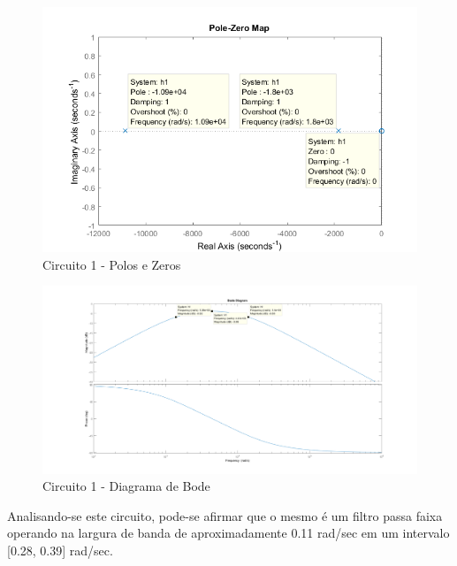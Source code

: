 \documentclass[a4paper, 12pt]{article}
\begin{document}
			\begin{figure}[!ht]
				\centering
				\includegraphics[scale=0.7]{img/1e_circ1.png}
				\caption{Circuito 1 - Polos e Zeros}	
			\end{figure}	
			
			\begin{figure}[!ht]
				\centering
				\includegraphics[scale=0.9]{img/1f_circ1.png}
				\caption{Circuito 1 - Diagrama de Bode}	
			\end{figure}						
											
			Analisando-se este circuito, pode-se afirmar que o mesmo é um filtro passa faixa operando na largura de banda de aproximadamente 0.11 rad/sec em um intervalo [0.28, 0.39] rad/sec.
			\newpage
\end{document}
